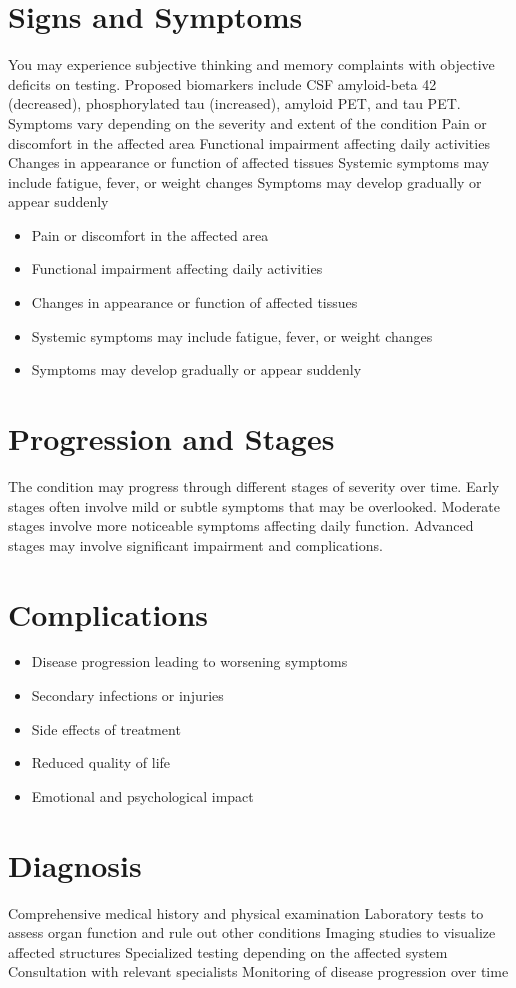 \section{Signs and Symptoms}
You may experience subjective thinking and memory complaints with objective deficits on testing. Proposed biomarkers include CSF amyloid-beta 42 (decreased), phosphorylated tau (increased), amyloid PET, and tau PET. Symptoms vary depending on the severity and extent of the condition Pain or discomfort in the affected area Functional impairment affecting daily activities Changes in appearance or function of affected tissues Systemic symptoms may include fatigue, fever, or weight changes Symptoms may develop gradually or appear suddenly

\begin{itemize}[noitemsep]
  \item Pain or discomfort in the affected area
  \item Functional impairment affecting daily activities
  \item Changes in appearance or function of affected tissues
  \item Systemic symptoms may include fatigue, fever, or weight changes
  \item Symptoms may develop gradually or appear suddenly
\end{itemize}
\section{Progression and Stages}
The condition may progress through different stages of severity over time. Early stages often involve mild or subtle symptoms that may be overlooked. Moderate stages involve more noticeable symptoms affecting daily function. Advanced stages may involve significant impairment and complications.
\section{Complications}
\begin{itemize}[noitemsep]
  \item Disease progression leading to worsening symptoms
  \item Secondary infections or injuries
  \item Side effects of treatment
  \item Reduced quality of life
  \item Emotional and psychological impact
\end{itemize}
\section{Diagnosis}
Comprehensive medical history and physical examination Laboratory tests to assess organ function and rule out other conditions Imaging studies to visualize affected structures Specialized testing depending on the affected system Consultation with relevant specialists Monitoring of disease progression over time

